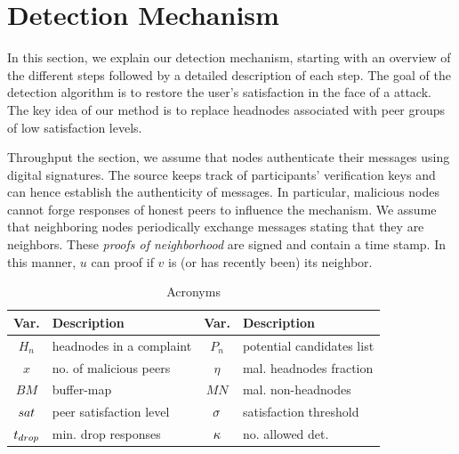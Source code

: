 \section{Detection Mechanism}
\label{sec:detection}


In this section, we explain our detection mechanism, starting with an overview of the different steps followed by a detailed description of each step.  
The goal of the detection algorithm is to restore the user's satisfaction in the face of a \drop attack. The key idea of our method is to replace headnodes associated with peer groups of low satisfaction levels. 

Throughput the section, we assume that nodes authenticate their messages using digital signatures. 
The source keeps track of participants' verification keys and can hence establish the authenticity of messages.
In particular, malicious nodes cannot forge responses of honest peers to influence the mechanism. 
We assume that neighboring nodes periodically exchange messages stating that they are neighbors.
These \emph{proofs of neighborhood} are signed and contain a time stamp. 
In this manner, $u$ can proof if $v$ is (or has recently been) its neighbor. 


\begin{table}[ht]
\center
\caption{Acronyms}
\begin{tabular}{|c|l||c|l|}
\hline

\bf{Var.} & \bf{Description}  & \bf{Var.} & \bf{Description} \\\hline\hline
$H_n$ & headnodes in a complaint & $P_n$ & potential candidates list \\\hline
$x$ & no. of malicious peers & $\eta$ & mal. headnodes fraction\\\hline
$BM$ & buffer-map & $MN$ & mal. non-headnodes \\\hline
$sat$ & peer satisfaction level & $\sigma$ & satisfaction threshold \\\hline
$t_{drop}$ & min. drop responses & $\kappa$ & no. allowed det. \\\hline
\end{tabular}
\label{tab:acronyms}
\vspace{-3mm}
\end{table}




